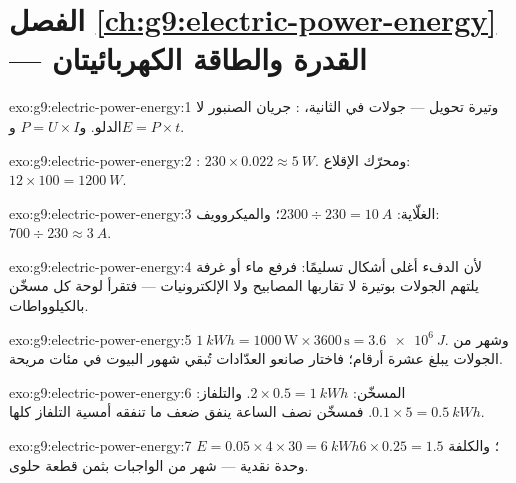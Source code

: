 \section*{الفصل \ref{ch:g9:electric-power-energy} --- القدرة والطاقة الكهربائيتان}

\begin{solution}{exo:g9:electric-power-energy:1}
 وتيرة تحويل  --- جولات في الثانية، : جريان
الصنبور لا الدلو. و$P = U \times I$ و$E = P \times t$.
\end{solution}

\begin{solution}{exo:g9:electric-power-energy:2}
: $230 \times 0.022 \approx \qty{5}{W}$. ومحرّك
الإقلاع: $12 \times 100 = \qty{1200}{W}$.
\end{solution}

\begin{solution}{exo:g9:electric-power-energy:3}
الغلّاية: $2300 \div 230 = \qty{10}{A}$؛ والميكروويف:
$700 \div 230 \approx \qty{3}{A}$.
\end{solution}

\begin{solution}{exo:g9:electric-power-energy:4}
لأن الدفء أغلى أشكال  تسليمًا: فرفع  ماء أو
غرفة يلتهم الجولات بوتيرة لا تقاربها المصابيح ولا
الإلكترونيات --- فتقرأ لوحة كل مسخّن بالكيلوواطات.
\end{solution}

\begin{solution}{exo:g9:electric-power-energy:5}
$\qty{1}{kWh} = 1000 \, \text{W} \times 3600 \, \text{s} =
\qty{3.6e6}{J}$. وشهر من الجولات يبلغ عشرة أرقام؛ فاختار
صانعو العدّادات  تُبقي شهور البيوت في مئات مريحة.
\end{solution}

\begin{solution}{exo:g9:electric-power-energy:6}
المسخّن: $2 \times 0.5 = \qty{1}{kWh}$. والتلفاز:
$0.1 \times 5 = \qty{0.5}{kWh}$. فمسخّن نصف الساعة ينفق ضعف
ما تنفقه أمسية التلفاز كلها.
\end{solution}

\begin{solution}{exo:g9:electric-power-energy:7}
$E = 0.05 \times 4 \times 30 = \qty{6}{kWh}$؛ والكلفة
$6 \times 0.25 = 1.5$ وحدة نقدية --- شهر من الواجبات بثمن
قطعة حلوى.
\end{solution}

